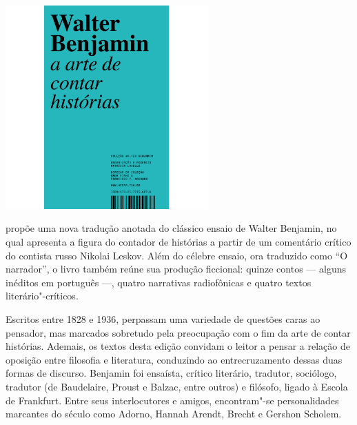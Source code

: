 \pagebreak


\begin{center}
\hspace*{.5cm}\includegraphics[width=78mm]{./grid/benjamin.jpg}
\end{center}

\hspace*{-7cm}\hrulefill\hspace*{-7cm}

\medskip

 propõe uma nova tradução anotada do clássico ensaio de Walter Benjamin, no qual apresenta a figura do contador de histórias a partir de um comentário crítico do contista russo Nikolai Leskov. Além do célebre ensaio, ora traduzido como “O narrador”, o livro também reúne sua produção ficcional: quinze contos --- alguns inéditos em português ---, quatro narrativas radiofônicas e quatro textos literário"-críticos.

Escritos entre 1828 e 1936, perpassam uma variedade de questões caras ao pensador, mas marcados sobretudo pela preocupação com o fim da arte de contar histórias. Ademais, os textos desta edição convidam o leitor a pensar a relação de oposição entre filosofia e literatura, conduzindo ao entrecruzamento dessas duas formas de discurso. Benjamin foi ensaísta, crítico literário, tradutor, sociólogo, tradutor (de Baudelaire, Proust e Balzac, entre outros) e filósofo, ligado à Escola de Frankfurt. Entre seus interlocutores e amigos, encontram"-se personalidades marcantes do século  como Adorno, Hannah Arendt, Brecht e Gershon Scholem.


\vfill

\hspace*{-.4cm}\begin{minipage}[c]{.6\linewidth}
\small{
{}}
\end{minipage}


